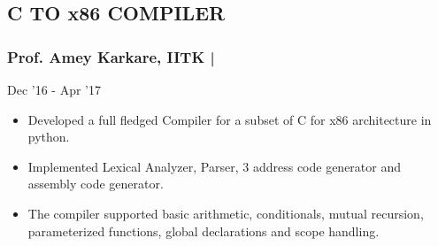 \documentclass[letterpaper]{twentysecondcv} %
\begin{document}
\subsection{C TO x86 COMPILER}
\subsubsection{Prof. Amey Karkare, IITK | } \hfill{} Dec '16 - Apr '17

\begin{itemize}
\item Developed a full fledged Compiler for a subset of C for x86 architecture in python.
\item Implemented Lexical Analyzer, Parser, 3 address code generator and assembly code generator.
\item The compiler supported basic arithmetic, conditionals, mutual recursion, parameterized functions, global declarations and scope handling.
\end{itemize}



\end{document}
